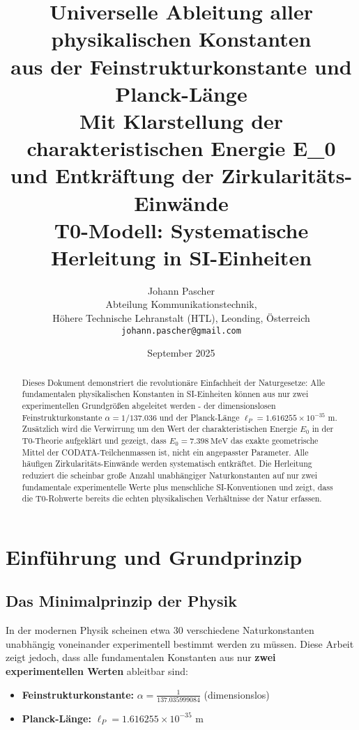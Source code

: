 \documentclass[12pt,a4paper]{article}
\title{\textbf{Universelle Ableitung aller physikalischen Konstanten\\aus der Feinstrukturkonstante und Planck-L\"ange}\\[0.5cm]
	\large Mit Klarstellung der charakteristischen Energie E\_0\\und Entkr\"aftung der Zirkularit\"ats-Einw\"ande\\[0.3cm]
	\normalsize T0-Modell: Systematische Herleitung in SI-Einheiten}
\author{Johann Pascher\\
	\small Abteilung Kommunikationstechnik,\\
	\small H\"ohere Technische Lehranstalt (HTL), Leonding, \"Osterreich\\
	\small \texttt{johann.pascher@gmail.com}}
\date{September 2025}
\theoremstyle{definition}
\begin{document}
	
	\maketitle
	
	\begin{abstract}
		Dieses Dokument demonstriert die revolution\"are Einfachheit der Naturgesetze: Alle fundamentalen physikalischen Konstanten in SI-Einheiten k\"onnen aus nur zwei experimentellen Grundgr\"o\ss{}en abgeleitet werden - der dimensionslosen Feinstrukturkonstante $\alpha = 1/137.036$ und der Planck-L\"ange $\ell_P = 1.616255 \times 10^{-35}$ m. Zus\"atzlich wird die Verwirrung um den Wert der charakteristischen Energie $E_0$ in der T0-Theorie aufgekl\"art und gezeigt, dass $E_0 = \SI{7.398}{\MeV}$ das exakte geometrische Mittel der CODATA-Teilchenmassen ist, nicht ein angepasster Parameter. Alle h\"aufigen Zirkularit\"ats-Einw\"ande werden systematisch entkr\"aftet. Die Herleitung reduziert die scheinbar gro\ss{}e Anzahl unabh\"angiger Naturkonstanten auf nur zwei fundamentale experimentelle Werte plus menschliche SI-Konventionen und zeigt, dass die T0-Rohwerte bereits die echten physikalischen Verh\"altnisse der Natur erfassen.
	\end{abstract}
	
	\tableofcontents
	\newpage
	
	\section{Einf\"uhrung und Grundprinzip}
	
	\subsection{Das Minimalprinzip der Physik}
	
	In der modernen Physik scheinen etwa 30 verschiedene Naturkonstanten unabh\"angig voneinander experimentell bestimmt werden zu m\"ussen. Diese Arbeit zeigt jedoch, dass alle fundamentalen Konstanten aus nur \textbf{zwei experimentellen Werten} ableitbar sind:
	
	\begin{tcolorbox}[colback=blue!5!white,colframe=blue!75!black,title=Fundamentale Eingangsdaten]
		\begin{itemize}
			\item \textbf{Feinstrukturkonstante:} $\alpha = \frac{1}{137.035999084}$ (dimensionslos)
			\item \textbf{Planck-L\"ange:} $\ell_P = 1.616255 \times 10^{-35}$ \si{\meter}
		\end{itemize}
	\end{tcolorbox}
	
\end{document}
